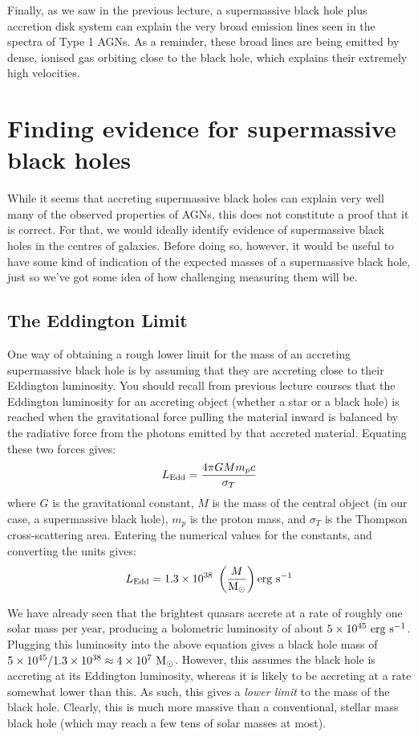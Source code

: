 \documentclass[11pt]{article}
\begin{document}
Finally, as we saw in the previous lecture, a supermassive black hole
plus accretion disk system can explain the very broad emission lines
seen in the spectra of Type 1 AGNs. As a reminder, these broad lines
are being emitted by dense, ionised gas orbiting close to the black
hole, which explains their extremely high velocities.

\section{Finding evidence for supermassive black holes}
While it seems that accreting supermassive black holes can explain
very well many of the observed properties of AGNs, this does not
constitute a proof that it is correct. For that, we would ideally
identify evidence of supermassive black holes in the centres of
galaxies. Before doing so, however, it would be useful to have some
kind of indication of the expected masses of a supermassive black
hole, just so we've got some idea of how challenging measuring them
will be.

\subsection{The Eddington Limit}
One way of obtaining a rough lower limit for the mass of an accreting
supermassive black hole is by assuming that they are accreting close
to their Eddington luminosity. You should recall from previous lecture
courses that the Eddington luminosity for an accreting object (whether
a star or a black hole) is reached when the gravitational force
pulling the material inward is balanced by the radiative force from
the photons emitted by that accreted material. Equating these two
forces gives:
\begin{equation}
L_{\rm Edd}=\frac{4\pi G M m_p c}{\sigma_T}
\end{equation}
where $G$ is the gravitational constant, $M$ is the mass of the
central object (in our case, a supermassive black hole), $m_p$ is the
proton mass, and $\sigma_T$ is the Thompson cross-scattering
area. Entering the numerical values for the constants, and converting
the units gives:
\begin{equation}
L_{\rm Edd}=1.3\times10^{38}~\left(\frac{M}{\rm M_\odot}\right){\rm erg~s^{-1}}
\end{equation}

We have already seen that the brightest quasars accrete at a rate of
roughly one solar mass per year, producing a bolometric luminosity of
about $5\times10^{45}~{\rm erg~s^{-1}}$. Plugging this luminosity into
the above equation gives a black hole mass of
$5\times10^{45}/1.3\times10^{38}\approx4\times10^7~{\rm
  M_\odot}$.
However, this assumes the black hole is accreting at its Eddington
luminosity, whereas it is likely to be accreting at a rate somewhat
lower than this. As such, this gives a {\it lower limit} to the mass
of the black hole. Clearly, this is much more massive than a
conventional, stellar mass black hole (which may reach a few tens of
solar masses at most).
\end{document}

